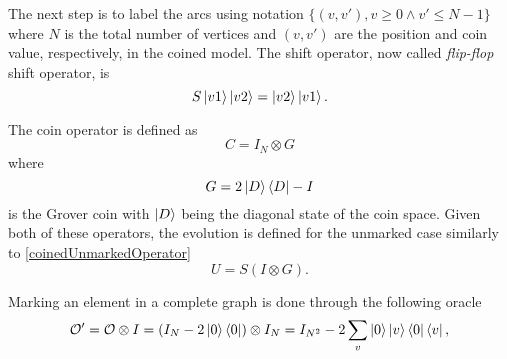 \documentclass[../../dissertation.tex]{subfiles}
\begin{document}
%                
The next step is to label the arcs using notation $\{(v,v'), v \geqslant 0 \land v' \leqslant N-1\}$ 
where $N$ is the total number of vertices and $(v,v')$ are the position and coin value, respectively, in the coined model. 
The shift operator, now called \textit{flip-flop} shift operator, is
\begin{equation}
	S\ket{v1}\ket{v2} = \ket{v2}\ket{v1}.
\end{equation}\par
The coin operator is defined as
\begin{equation}
	C = I_N \otimes G
\end{equation}
where 
\begin{equation}
	G = 2\ket{D}\bra{D} - I
\end{equation}
is the Grover coin with $\ket{D}$ being the diagonal state of the coin space. Given both of these operators, the evolution is defined for the unmarked case similarly to \ref{coinedUnmarkedOperator}
\begin{equation}
	U = S(I \otimes G).
\end{equation}\par
Marking an element in a complete graph is done through the following oracle
\begin{equation}
	\mathcal{O'} =\mathcal{O}\otimes I = (I_N - 2\ket{0}\bra{0})\otimes I_N = I_{N^2} - 2 \sum_v \ket{0}\ket{v}\bra{0}\bra{v} ,
\end{equation}
\end{document}
